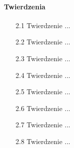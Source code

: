 \paragraph{Twierdzenia}	
\begin{enumerate}	
    \item [2.1] Twierdzenie ...
    \item [2.2] Twierdzenie ...
    \item [2.3] Twierdzenie ...
    \item [2.4] Twierdzenie ...
    \item [2.5] Twierdzenie ...
    \item [2.6] Twierdzenie ...
    \item [2.7] Twierdzenie ...
    \item [2.8] Twierdzenie ...

\end{enumerate}
